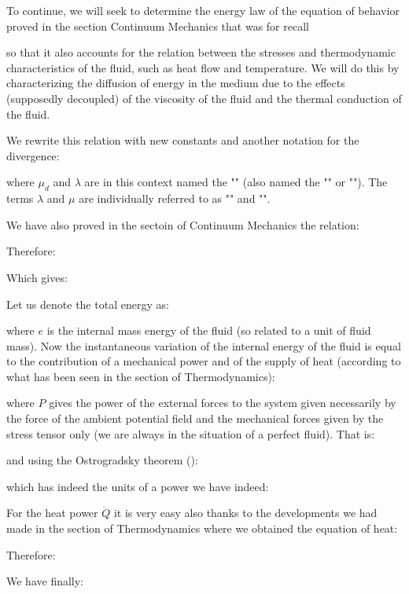 	To continue, we will seek to determine the energy law of the equation of behavior proved in the section Continuum Mechanics that was for recall
	
	so that it also accounts for the relation between the stresses and thermodynamic characteristics of the fluid, such as heat flow and temperature. We will do this by characterizing the diffusion of energy in the medium due to the effects  (supposedly decoupled) of the viscosity of the fluid and the thermal conduction of the fluid.

	We rewrite this relation with new constants and another notation for the divergence:
	
	where $\mu_d$ and $\lambda$ are in this context named the "" (also named the "" or ""). The terms $\lambda$ and $\mu$ are individually referred to as "" and "".
	
	We have also proved in the sectoin of Continuum Mechanics the relation:
	
	Therefore:
	
	Which gives:
	
	Let us denote the total energy as:
	
	where $e$ is the internal mass energy of the fluid (so related to a unit of fluid mass). Now the instantaneous variation of the internal energy of the fluid is equal to the contribution of a mechanical power and of the supply of heat (according to what has been seen in the section of Thermodynamics):
	
	where $P$ gives the power of the external forces  to the system given necessarily by the force of the ambient potential field and the mechanical forces given by the stress tensor only (we are always in the situation of a perfect fluid). That is:
	
	and using the Ostrogradsky theorem ():
	
	which has indeed the units of a power we have indeed:	
	
	For the heat power $\dot{Q}$ it is very easy also thanks to the developments we had made in the section of Thermodynamics where we obtained the equation of heat:
	
	Therefore:
	
	We have finally:
	
